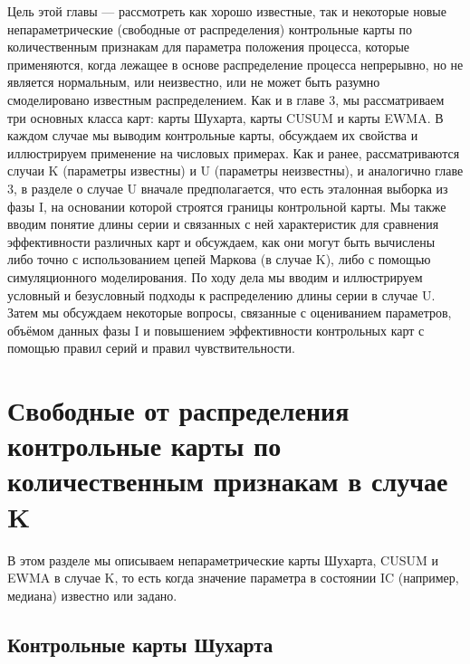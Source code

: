 Цель этой главы --- рассмотреть как хорошо известные, так и некоторые новые непараметрические (свободные от распределения) контрольные карты по количественным признакам для параметра положения процесса, которые применяются, когда лежащее в основе распределение процесса непрерывно, но не является нормальным, или неизвестно, или не может быть разумно смоделировано известным распределением. Как и в главе 3, мы рассматриваем три основных класса карт: карты Шухарта, карты CUSUM и карты EWMA. В каждом случае мы выводим контрольные карты, обсуждаем их свойства и иллюстрируем применение на числовых примерах. Как и ранее, рассматриваются случаи K (параметры известны) и U (параметры неизвестны), и аналогично главе 3, в разделе о случае U вначале предполагается, что есть эталонная выборка из фазы I, на основании которой строятся границы контрольной карты. Мы также вводим понятие длины серии и связанных с ней характеристик для сравнения эффективности различных карт и обсуждаем, как они могут быть вычислены либо точно с использованием цепей Маркова (в случае K), либо с помощью симуляционного моделирования. По ходу дела мы вводим и иллюстрируем условный и безусловный подходы к распределению длины серии в случае U. Затем мы обсуждаем некоторые вопросы, связанные с оцениванием параметров, объёмом данных фазы I и повышением эффективности контрольных карт с помощью правил серий и правил чувствительности.

\section{Свободные от распределения контрольные карты по количественным признакам в случае K}
В этом разделе мы описываем непараметрические карты Шухарта, CUSUM и EWMA в случае K, то есть когда значение параметра в состоянии IC (например, медиана) известно или задано.

\subsection{Контрольные карты Шухарта}
